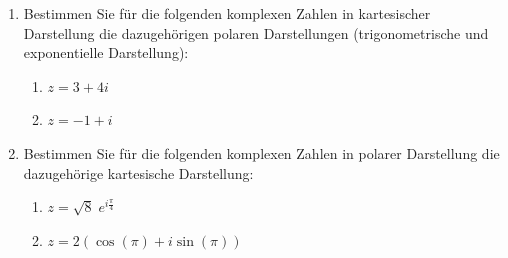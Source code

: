\begin{ExerciseBlock}
\begin{enumerate}[label=\alph*)]
	\item Bestimmen Sie für die folgenden komplexen Zahlen in kartesischer Darstellung die dazugehörigen polaren Darstellungen (trigonometrische und exponentielle Darstellung):
	\begin{enumerate}[label=\arabic*)]
		\item $z = 3 + 4i$
		\item $z = -1 + i$
	\end{enumerate}
	
	\item Bestimmen Sie für die folgenden komplexen Zahlen in polarer Darstellung die dazugehörige kartesische Darstellung:
	\begin{enumerate}[label=\arabic*)]
		\item $z = \sqrt{8} \; e^{i \frac{\pi}{4} }$
		\item $z = 2 \left( \cos\left( \pi \right) + i \sin\left( \pi \right) \right)$
	\end{enumerate}
\end{enumerate}

\end{ExerciseBlock}
